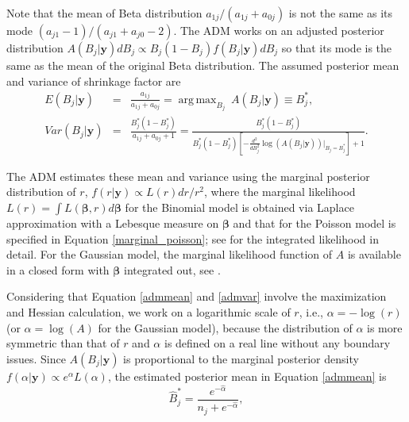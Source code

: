 \documentclass[article]{jss}
\DeclareMathOperator*{\argmax}{arg\,max}
\begin{document}
Note that the mean of Beta distribution $a_{1j}/(a_{1j}+a_{0j})$ is not the same as its mode $(a_{j1}-1)/(a_{j1}+a_{j0}-2)$. The ADM works on an adjusted posterior distribution $A(B_j\vert \boldsymbol{y})dB_j\propto B_j(1-B_j)f(B_j\vert \boldsymbol{y})dB_j$ so that its mode is the same as the mean of the original Beta distribution. The assumed posterior mean and variance of shrinkage factor are
\begin{eqnarray}
E(B_j\vert\boldsymbol{y})&=&\frac{a_{1j}}{a_{1j}+a_{0j}}=\argmax_{B_j}~ A(B_j\vert \boldsymbol{y})\equiv B^\ast_j,\label{admmean}\\
Var(B_j\vert\boldsymbol{y})&=&\frac{B^\ast_j(1-B^\ast_j)}{a_{1j}+a_{0j}+1}=\frac{B^\ast_j(1-B^\ast_j)}{B^\ast_j(1-B^\ast_j)[-\frac{d^2}{dB^2_j}\log(A(B_j\vert \boldsymbol{y}))\vert_{B_j=B^\ast_j}] +1}.\label{admvar}
\end{eqnarray}

The ADM estimates these mean and variance using the marginal posterior distribution of $r$, $f(r\vert\boldsymbol{y})\propto L(r)dr/r^2$, where the marginal likelihood $L(r)=\int L(\boldsymbol{\beta}, r)d\boldsymbol{\beta}$ for the Binomial model is obtained via Laplace approximation with a Lebesque measure on $\boldsymbol{\beta}$ and that for the Poisson model is specified in Equation \ref{marginal_poisson}; see \cite{berger1999integrated} for the integrated likelihood in detail. For the Gaussian model, the marginal likelihood function of $A$ is available in a closed form with $\boldsymbol{\beta}$ integrated out, see  \cite{tang2011}. 

Considering that Equation \ref{admmean} and  \ref{admvar} involve the maximization and Hessian calculation, we work on a logarithmic scale of $r$, i.e., $\alpha=-\log(r)$ (or $\alpha=\log(A)$ for the Gaussian model), because the distribution of $\alpha$ is more symmetric than that of $r$ and $\alpha$ is defined on a real line without any boundary issues. Since $A(B_j\vert\boldsymbol{y})$ is proportional to the marginal posterior density $f(\alpha\vert\boldsymbol{y})\propto e^\alpha L(\alpha)$, the estimated posterior mean in Equation \ref{admmean} is 
\begin{equation}\label{meaninvariance}
\hat{B}^\ast_j=\frac{e^{-\hat{\alpha}}}{n_j+e^{-\hat{\alpha}}},
\end{equation}

\end{document}

